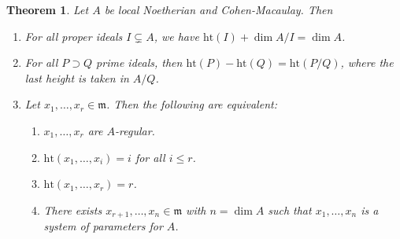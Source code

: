 \documentclass[leqno, openany]{memoir}
\newtheorem{thm}{Theorem}[section]
\theoremstyle{definition}
\theoremstyle{remark}
\theoremstyle{plain}
\theoremstyle{definition}
\theoremstyle{remark}
\newcommand{\mf}[1]{\mathfrak{#1}}
\newcommand{\mr}[1]{\mathrm{#1}}
\begin{document}
\begin{thm} Let $A$ be local Noetherian and Cohen-Macaulay. Then
    \begin{enumerate} \item For all proper ideals $I \subsetneq A$, we have
        $\mr{ht}(I) + \dim A/I = \dim A$.  \item For all $P \supset Q$ prime
        ideals, then $\mr{ht}(P) - \mr{ht}(Q) = \mr{ht}(P/Q)$, where the last
        height is taken in $A/Q$.  \item Let $x_1, \ldots, x_r \in \mf{m}$.
        Then the following are equivalent: \begin{enumerate} \item $x_1,
            \ldots, x_r$ are $A$-regular.  \item $\mr{ht}(x_1, \ldots, x_i) =
            i$ for all $i \leq r$.  \item $\mr{ht}(x_1, \ldots, x_r) = r$.
\item There exists $x_{r+1}, \ldots, x_n \in \mf{m}$ with $n = \dim A$ such
that $x_1, \ldots, x_n$ is a system of parameters for $A$.  \end{enumerate}
\end{enumerate} \end{thm}
\end{document}
